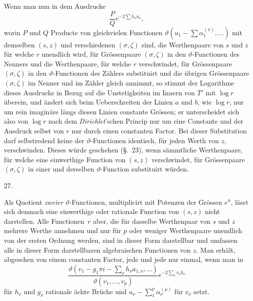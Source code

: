 \documentclass[a4paper,12pt,leqno]{article}
\begin{document}
Wenn man nun in dem Ausdrucke
\[ \frac{P}{Q} e^{- 2 \sum h_\nu u_\nu},\]
worin $P$ und $Q$ Producte von gleichvielen Functionen
$\vartheta( u_1 - \sum \alpha_1^{(\pi)},\ldots )$
mit demselben $(s, z)$ und verschiedenen $(\sigma, \zeta)$ sind,
die Werthenpaare von $s$ und $z$ f\"{u}r welche $r$ unendlich
wird, f\"{u}r Gr\"{o}ssenpaare $(\sigma, \zeta)$ in den
$\vartheta$-Functionen des Nenners und die Werthenpaare, f\"{u}r
welche $r$ verschwindet, f\"{u}r Gr\"{o}ssenpaare
$(\sigma, \zeta)$ in den $\vartheta$-Functionen des Z\"{a}hlers
substituirt und die \"{u}brigen Gr\"{o}ssenpaare
$(\sigma, \zeta)$ im Nenner und im Z\"{a}hler gleich annimmt, so
stimmt der Logarithme dieses Ausdrucks in Bezug auf die
Unstetigkeiten im Innern von $T'$ mit $\log r$ \"{u}berein, und
\"{a}ndert sich beim Ueberschreiten der Linien $a$ und $b$, wie
$\log r$, nur um rein imagin\"{a}re l\"{a}ngs diesen Linien
constante Gr\"{o}ssen; er unterscheidet sich also von $\log r$
nach dem \emph{Dirichlet}'schen Princip nur um eine Constante
und der Ausdruck selbst von $r$ nur durch einen constanten
Factor.  Bei dieser Substitution darf selbstredend keine der
$\vartheta$-Functionen identisch, f\"{u}r jeden Werth von $z$,
verschwinden.  Dieses w\"{u}rde geschehen (\S.~23), wenn
s\"{a}mmtliche Werthenpaare, f\"{u}r welche eine einwerthige
Function von $(s,z)$ verschwindet, f\"{u}r Gr\"{o}ssenpaare
$(\sigma, \zeta)$ in einer und derselben $\vartheta$-Function
substituirt w\"{u}rden.

\medbreak

\centerline{27.}

\nobreak\medskip

Als Quotient \emph{zweier} $\vartheta$-Functionen, multiplicirt
mit Potenzen der Gr\"{o}ssen $e^u$, l\"{a}sst sich demnach eine
einwerthige oder rationale Function von $(s,z)$ nicht darstellen.
Alle Functionen~$r$ aber, die f\"{u}r dasselbe Werthenpaar von
$s$ und $z$ mehrere Werthe annehmen und nur f\"{u}r $p$ oder
weniger Werthenpaare unendlich von der ersten Ordnung werden,
sind in dieser Form darstellbar und umfassen alle in dieser Form
darstellbaren algebraischen Functionen von $z$.  Man erh\"{a}lt,
abgesehen von einem constanten Factor, jede und jede nur einmal,
wenn man in
\[ \frac{
   \vartheta( v_1 - g_1 \pi i - \sum\limits_\nu h_\nu a_{1,\nu},\ldots)}{
   \vartheta( v_1,\ldots, v_p)}
   e^{-2 \sum\limits_\nu v_\nu h_\nu} \]
f\"{u}r $h_\nu$ und $g_\nu$ rationale \"{a}chte Br\"{u}che und
$\displaystyle u_\nu - \sum\limits_1^p \alpha_\nu^{(\mu)}$
f\"{u}r $v_\nu$ setzt.
\end{document}
